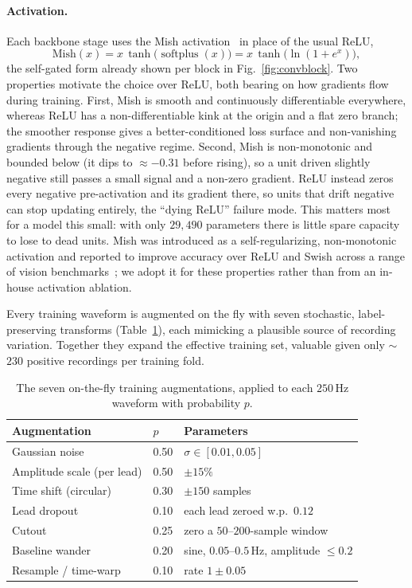 \documentclass[sigconf,nonacm]{acmart}
\begin{document}
\paragraph{Activation.}
Each backbone stage uses the Mish activation~\cite{misra_mish_2020} in place
of the usual ReLU,
\begin{equation}
\mathrm{Mish}(x) = x\,\tanh\!\big(\operatorname{softplus}(x)\big)
                 = x\,\tanh\!\big(\ln(1+e^{x})\big),
\label{eq:mish}
\end{equation}
the self-gated form already shown per block in Fig.~\ref{fig:convblock}.
Two properties motivate the choice over ReLU, both bearing on how gradients
flow during training. First, Mish is smooth and continuously differentiable
everywhere, whereas ReLU has a non-differentiable kink at the origin and a
flat zero branch; the smoother response gives a better-conditioned loss
surface and non-vanishing gradients through the negative regime. Second, Mish
is non-monotonic and bounded below (it dips to $\approx-0.31$ before rising),
so a unit driven slightly negative still passes a small signal and a non-zero
gradient. ReLU instead zeros every negative pre-activation and its gradient
there, so units that drift negative can stop updating entirely, the
``dying ReLU'' failure mode. This matters most for a model this small: with
only $29{,}490$ parameters there is little spare capacity to lose to dead
units. Mish was introduced as a self-regularizing, non-monotonic activation
and reported to improve accuracy over ReLU and Swish across a range of vision
benchmarks~\cite{misra_mish_2020}; we adopt it for these properties rather
than from an in-house activation ablation.

Every training waveform is augmented on the fly with seven stochastic,
label-preserving transforms (Table~\ref{tab:aug}), each mimicking a plausible
source of recording variation. Together they expand the effective training
set, valuable given only $\sim$$230$ positive recordings per training
fold.

\begin{table}[H]
\centering
\caption{The seven on-the-fly training augmentations, applied to each
$250$\,Hz waveform with probability $p$.}
\label{tab:aug}
\small
\begin{tabular}{@{}llp{3.4cm}@{}}
\toprule
\textbf{Augmentation} & \textbf{$p$} & \textbf{Parameters} \\
\midrule
Gaussian noise          & 0.50 & $\sigma \in [0.01, 0.05]$ \\
Amplitude scale (per lead) & 0.50 & $\pm15\%$ \\
Time shift (circular)   & 0.30 & $\pm150$ samples \\
Lead dropout            & 0.10 & each lead zeroed w.p.\ $0.12$ \\
Cutout                  & 0.25 & zero a $50$--$200$-sample window \\
Baseline wander         & 0.20 & sine, $0.05$--$0.5$\,Hz, amplitude $\le 0.2$ \\
Resample / time-warp    & 0.10 & rate $1 \pm 0.05$ \\
\bottomrule
\end{tabular}
\end{table}
\end{document}

